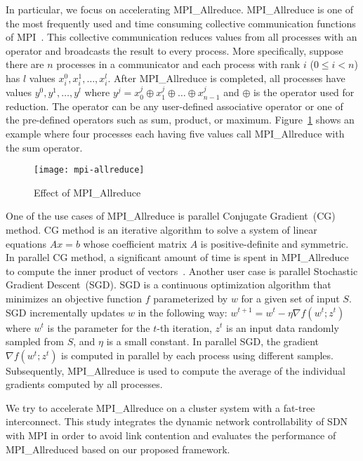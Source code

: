 In particular, we focus on accelerating MPI\_Allreduce.
MPI\_Allreduce is one of the most frequently used and time consuming
collective communication functions of MPI\@~\cite{Chunduri2018}.
This collective communication reduces values from all
processes with an operator and broadcasts the result to every process.
More specifically, suppose there are $n$ processes in a communicator and
each process with rank $i$ ($0 \leq i < n$) has $l$ values $x_i^0, x_i^1,
\dots, x_i^l$. After MPI\_Allreduce is completed, all processes have values
$y^0, y^1, \dots, y^l$ where $y^j = x_0^j \oplus x_1^j \oplus \dots \oplus
x_{n-1}^j$ and $\oplus$ is the operator used for reduction. The operator can
be any user-defined associative operator or one of the pre-defined operators
such as sum, product, or maximum. Figure~\ref{fig:mpi-allreduce} shows an
example where four processes each having five values call MPI\_Allreduce with
the sum operator.

\begin{figure}
    \centering
    \texttt{[image: mpi-allreduce]}
    \caption{Effect of MPI\_Allreduce}%
    \label{fig:mpi-allreduce}
\end{figure}

One of the use cases of MPI\_Allreduce is parallel Conjugate Gradient~(CG)
method. CG method is an iterative algorithm to solve a system of linear
equations $Ax = b$ whose coefficient matrix $A$ is positive-definite and
symmetric. In parallel CG method, a significant amount of time is spent in
MPI\_Allreduce to compute the inner product of
vectors~\autocite{Kandalla2012}. Another user case is parallel Stochastic
Gradient Descent~(SGD). SGD is a continuous optimization algorithm that
minimizes an objective function $f$ parameterized by $w$ for a given set of
input $S$. SGD incrementally updates $w$ in the following way: $w^{t+1}=w^t-
\eta \nabla f(w^t; z^t)$ where $w^t$ is the parameter for the $t$-th
iteration, $z^t$ is an input data randomly sampled from $S$, and $\eta$ is a
small constant. In parallel SGD, the gradient $\nabla f(w^t; z^t)$ is computed
in parallel by each process using different samples. Subsequently,
MPI\_Allreduce is used to compute the average of the individual gradients
computed by all processes.

We try to accelerate MPI\_Allreduce on a cluster system with a fat-tree
interconnect. This study integrates the dynamic network controllability of SDN
with MPI in order to avoid link contention and evaluates the performance of
MPI\_Allreduced based on our proposed framework.

